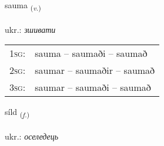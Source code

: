 \documentclass[frontgrid, backgrid]{flacards}\usepackage[]{graphicx}\usepackage[]{xcolor}
\begin{document}
\renewcommand{\flhead}{\vskip5pt \fboxsep=0pt {\small\bfseries\footnotesize Sagnorð | дієслово}}
\renewcommand{\fcfoot}{\vskip5pt \fboxsep=0pt \hspace{2pt}{\small\bfseries\footnotesize 3K}}

\renewcommand{\blhead}{\vskip5pt {\small\bfseries\footnotesize Sagnorð | дієслово }}
\renewcommand{\bcfoot}{\vskip5pt \hspace{2pt}{\small\bfseries\footnotesize 3K}}


{sauma \small{\textsubscript{(\textit{v.})}} \\[1ex] %
\textphonetic{[sœiːma]} \\
ukr.: \emph{зшивати} \\  [2ex]
\renewcommand*{\arraystretch}{0.8}
\begin{tabular}{p{1cm}l}
\textsc{1sg}: & sauma -- saumaði -- saumað \\ 
\textsc{2sg}: & saumar -- saumaðir -- saumað \\ 
\textsc{3sg}: & saumar -- saumaði -- saumað \\ 
\end{tabular}
}

\renewcommand{\flhead}{\vskip5pt \fboxsep=0pt {\small\bfseries\footnotesize Nafnorð | іменник}}
\renewcommand{\fcfoot}{\vskip5pt \fboxsep=0pt \hspace{2pt}{\small\bfseries\footnotesize 3K}}

\renewcommand{\blhead}{\vskip5pt {\small\bfseries\footnotesize Nafnorð | іменник }}
\renewcommand{\bcfoot}{\vskip5pt \hspace{2pt}{\small\bfseries\footnotesize 3K}}


{síld \small{\textsubscript{(\textit{f.})}} \\[1ex] %
\textphonetic{[silt]} \\
ukr.: \emph{оселедець} \\  [2ex]
\renewcommand*{\arraystretch}{0.8}
}
\end{document}

